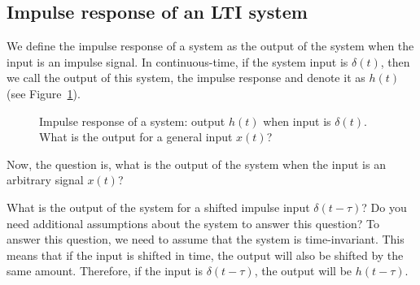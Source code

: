 \subsection{Impulse response of an LTI system}
We define the impulse response of a system as the output of the system when the input is an impulse signal. In continuous-time, if the system input is $\delta(t)$, then we call the output of this system, the impulse response and denote it as $h(t)$ (see Figure~\ref{fig:impulse-response}).
\begin{figure}[h]
\centering
{}
\caption{Impulse response of a system: output $h(t)$ when input is $\delta(t)$. What is the output for a general input $x(t)$?}
\label{fig:impulse-response}
\end{figure}
Now, the question is, what is the output of the system when the input is an arbitrary signal $x(t)$? 
\begin{popquiz}
    What is the output of the system for a shifted impulse input $\delta(t - \tau)$? Do you need additional assumptions about the system to answer this question?
    \popqsplit
    To answer this question, we need to assume that the system is time-invariant. This means that if the input is shifted in time, the output will also be shifted by the same amount. Therefore, if the input is $\delta(t - \tau)$, the output will be $h(t - \tau)$.
\end{popquiz}

